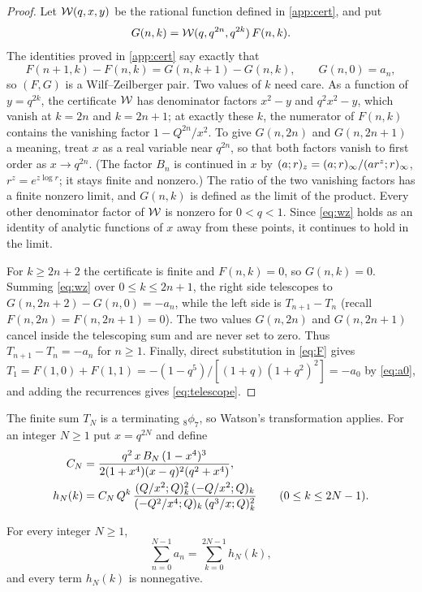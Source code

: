 \begin{proof}
Let $\mathcal{W}(q,x,y)$ be the rational function defined in \cref{app:cert}, and
put
\[
G(n,k)=\mathcal{W}(q,q^{2n},q^{2k})\,F(n,k).
\]
The identities proved in \cref{app:cert} say exactly that
\begin{equation}\label{eq:wz}
F(n+1,k)-F(n,k)=G(n,k+1)-G(n,k),\qquad G(n,0)=a_n,
\end{equation}
so $(F,G)$ is a Wilf--Zeilberger pair. Two values of $k$ need care. As a
function of $y=q^{2k}$, the certificate $\mathcal{W}$ has denominator factors
$x^2-y$ and $q^2x^2-y$, which vanish at $k=2n$ and $k=2n+1$; at exactly these
$k$, the numerator of $F(n,k)$ contains the vanishing factor $1-Q^{2n}/x^2$.
To give $G(n,2n)$ and $G(n,2n+1)$ a meaning, treat $x$ as a real variable near
$q^{2n}$, so that both factors vanish to first order as $x\to q^{2n}$. (The
factor $B_n$ is continued in $x$ by
$(a;r)_{z}=(a;r)_{\infty}/(ar^z;r)_{\infty}$, $r^z=e^{z\log r}$;
it stays finite and nonzero.) The ratio of the two vanishing factors has a
finite nonzero limit, and $G(n,k)$ is defined as the limit of the product.
Every other denominator factor of $\mathcal{W}$ is nonzero for $0<q<1$. Since
\eqref{eq:wz} holds as an identity of analytic functions of $x$ away from these
points, it continues to hold in the limit.

For $k\ge2n+2$ the certificate is finite and $F(n,k)=0$, so $G(n,k)=0$.
Summing \eqref{eq:wz} over $0\le k\le2n+1$, the right side telescopes to
$G(n,2n+2)-G(n,0)=-a_n$, while the left side is $T_{n+1}-T_n$ (recall
$F(n,2n)=F(n,2n+1)=0$). The two values $G(n,2n)$ and $G(n,2n+1)$ cancel inside
the telescoping sum and are never set to zero. Thus $T_{n+1}-T_n=-a_n$ for
$n\ge1$. Finally, direct substitution in \eqref{eq:F} gives
$T_1=F(1,0)+F(1,1)=-(1-q^5)/[(1+q)(1+q^2)^2]=-a_0$ by \eqref{eq:a0}, and
adding the recurrences gives \eqref{eq:telescope}.
\end{proof}

The finite sum $T_N$ is a terminating ${}_8\phi_7$, so Watson's transformation
applies. For an integer $N\ge1$ put $x=q^{2N}$ and define
\begin{align}
C_N&=\frac{q^2\,x\,B_N\,(1-x^4)^3}{2(1+x^4)(x-q)^2(q^2+x^4)},\label{eq:CN}\\
h_N(k)&=C_N\,Q^k\,
\frac{(Q/x^2;Q)_{k}^2\,(-Q/x^2;Q)_{k}}
{(-Q^2/x^4;Q)_{k}\,(q^3/x;Q)_{k}^2}\qquad(0\le k\le2N-1).\label{eq:hN}
\end{align}

\begin{lemma}\label{lem:watson}
For every integer $N\ge1$,
\begin{equation}\label{eq:watsonsum}
\sum_{n=0}^{N-1}a_n=\sum_{k=0}^{2N-1}h_N(k),
\end{equation}
and every term $h_N(k)$ is nonnegative.
\end{lemma}

